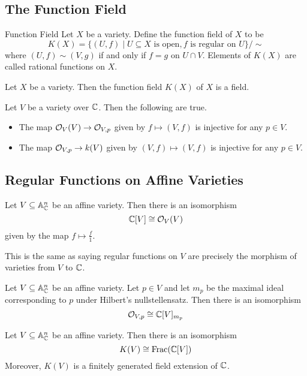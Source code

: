 \documentclass[a4paper]{article}
\begin{document}
\subsection{The Function Field}
\begin{defn}{Function Field}{} Let $X$ be a variety. Define the function field of $X$ to be $$K(X)=\{(U,f)\;|\;U\subseteq X\text{ is open}, f\text{ is regular on }U\}/\sim$$ where $(U,f)\sim(V,g)$ if and only if $f=g$ on $U\cap V$. Elements of $K(X)$ are called rational functions on $X$. 
\end{defn}

\begin{lmm}{}{} Let $X$ be a variety. Then the function field $K(X)$ of $X$ is a field. 
\end{lmm}

\begin{lmm}{}{} Let $V$ be a variety over $\mathbb{C}$. Then the following are true. 
\begin{itemize}
\item The map $\mathcal{O}_V(V)\to\mathcal{O}_{V,p}$ given by $f\mapsto(V,f)$ is injective for any $p\in V$. 
\item The map $\mathcal{O}_{V,p}\to k(V)$ given by $(V,f)\mapsto(V,f)$ is injective for any $p\in V$. 
\end{itemize}
\end{lmm}

\subsection{Regular Functions on Affine Varieties}
\begin{prp}{}{} Let $V\subseteq\mathbb{A}_{\mathbb{C}}^n$ be an affine variety. Then there is an isomorphism $$\mathbb{C}[V]\cong\mathcal{O}_V(V)$$ given by the map $f\mapsto\frac{f}{1}$. 
\end{prp}

This is the same as saying regular functions on $V$ are precisely the morphism of varieties from $V$ to $\mathbb{C}$. 

\begin{prp}{}{} Let $V\subseteq\mathbb{A}_{\mathbb{C}}^n$ be an affine variety. Let $p\in V$ and let $m_p$ be the maximal ideal corresponding to $p$ under Hilbert's nullstellensatz. Then there is an isomorphism $$\mathcal{O}_{V,p}\cong\mathbb{C}[V]_{m_p}$$
\end{prp}

\begin{prp}{}{} Let $V\subseteq\mathbb{A}_{\mathbb{C}}^n$ be an affine variety. Then there is an isomorphism $$K(V)\cong\text{Frac}(\mathbb{C}[V])$$ Moreover, $K(V)$ is a finitely generated field extension of $\mathbb{C}$. 
\end{prp}
\end{document}
